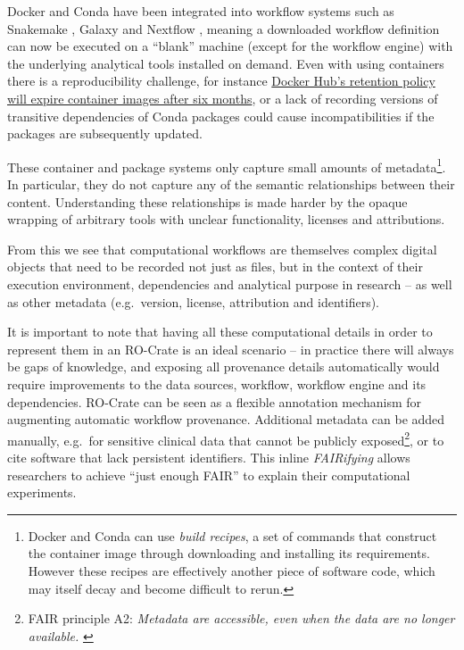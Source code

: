 {Docker and Conda have been integrated into workflow systems such as
Snakemake
\cite{ch5-73}, Galaxy
\cite{Afgan 2018} and Nextflow
\cite{Di Tommaso 2017}, meaning a downloaded
workflow definition can now be executed on a ``blank'' machine (except
for the workflow engine) with the underlying analytical tools installed
on demand. Even with using containers there is a reproducibility
challenge, for instance
\href{https://www.docker.com/blog/docker-hub-image-retention-policy-delayed-and-subscription-updates/}{Docker
Hub's retention policy will expire container images after six months},
or a lack of recording versions of transitive dependencies of Conda
packages could cause incompatibilities if the packages are subsequently
updated.

These container and package systems only capture small amounts of
metadata\footnote{Docker and Conda can use \emph{build recipes}, a set
  of commands that construct the container image through downloading and
  installing its requirements. However these recipes are effectively
  another piece of software code, which may itself decay and become
  difficult to rerun.}. In particular, they do not capture any of the
semantic relationships between their content. Understanding these
relationships is made harder by the opaque wrapping of arbitrary tools
with unclear functionality, licenses and attributions.

From this we see that computational workflows are themselves complex
digital objects that need to be recorded not just as files, but in the
context of their execution environment, dependencies and analytical
purpose in research -- as well as other metadata (e.g.~version, license,
attribution and identifiers).

It is important to note that having all these computational details in
order to represent them in an RO-Crate is an ideal scenario -- in
practice there will always be gaps of knowledge, and exposing all
provenance details automatically would require improvements to the data
sources, workflow, workflow engine and its dependencies. RO-Crate can be
seen as a flexible annotation mechanism for augmenting automatic
workflow provenance. Additional metadata can be added manually, e.g.~for
sensitive clinical data that cannot be publicly exposed\footnote{FAIR
  principle A2: \emph{Metadata are accessible, even when the data are no
  longer available.}
  \cite{ch5-123}}, or to cite
software that lack persistent identifiers. This inline \emph{FAIRifying}
allows researchers to achieve ``just enough FAIR'' to explain their
computational experiments.

}
